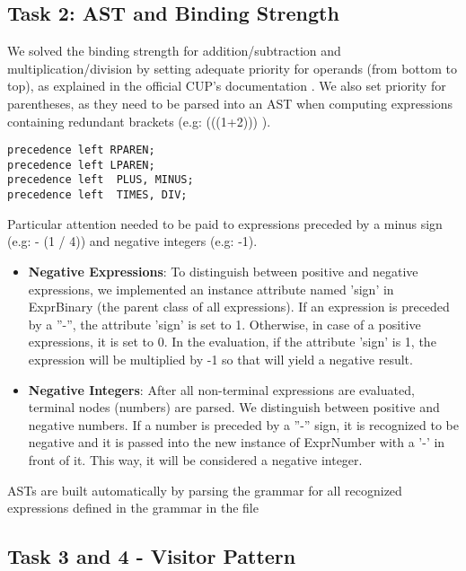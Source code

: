 \documentclass[paper=a4, fontsize=11pt]{scrartcl}
\numberwithin{equation}{section}		%
\numberwithin{figure}{section}			%
\numberwithin{table}{section}				%
\begin{document}
\subsection*{Task 2: AST and Binding Strength}
\label{Task2}
We solved the binding strength for addition/subtraction and multiplication/division by setting adequate priority for operands (from bottom to top), as explained in the official CUP's documentation \cite{key01}. We also set priority for parentheses, as they need to be parsed into an AST when computing expressions containing redundant brackets (e.g: (((1+2))) ).

\begin{lstlisting}
precedence left RPAREN;
precedence left LPAREN;
precedence left  PLUS, MINUS;
precedence left  TIMES, DIV;
\end{lstlisting}

Particular attention needed to be paid to expressions preceded by a minus sign (e.g: - (1 / 4)) and negative integers (e.g: -1).
\begin{itemize}
	\item \textbf{Negative Expressions}: To distinguish between positive and negative expressions, we implemented an instance attribute named 'sign' in ExprBinary (the parent class of all expressions).
If an expression is preceded by a ''-'', the attribute 'sign' is set to 1. Otherwise, in case of a positive expressions, it is set to 0. In the evaluation, if the attribute 'sign' is 1, the expression will be multiplied by -1 so that will yield a negative result.  
	\item \textbf{Negative Integers}: After all non-terminal expressions are evaluated, terminal nodes (numbers) are parsed. We distinguish between positive and negative numbers. If a number is preceded by a ''-'' sign, it is recognized to be negative and it is passed into the new instance of ExprNumber with a '-' in front of it. This way, it will be considered a negative integer.
\end{itemize}
ASTs are built automatically by parsing the grammar for all recognized expressions defined in the grammar in the file 

\subsection*{Task 3 and 4 - Visitor Pattern}
\end{document}
